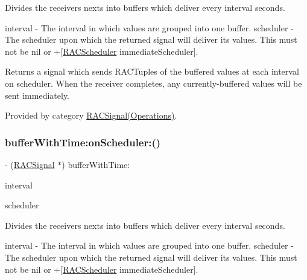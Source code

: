 Divides the receiver\textquotesingle{}s {\ttfamily next}s into buffers which deliver every {\ttfamily interval} seconds.

interval -\/ The interval in which values are grouped into one buffer. scheduler -\/ The scheduler upon which the returned signal will deliver its values. This must not be nil or +\mbox{[}\mbox{\hyperlink{interface_r_a_c_scheduler}{R\+A\+C\+Scheduler}} immediate\+Scheduler\mbox{]}.

Returns a signal which sends R\+A\+C\+Tuples of the buffered values at each interval on {\ttfamily scheduler}. When the receiver completes, any currently-\/buffered values will be sent immediately. 

Provided by category \mbox{\hyperlink{category_r_a_c_signal_07_operations_08_a7f0cb2086a2123f40552d2eab2a9cc54}{R\+A\+C\+Signal(\+Operations)}}.

\mbox{\label{interface_r_a_c_signal_a7f0cb2086a2123f40552d2eab2a9cc54}} 
\subsubsection{\texorpdfstring{buffer\+With\+Time\+:on\+Scheduler\+:()}{bufferWithTime:onScheduler:()}\hspace{0.1cm}{\footnotesize\ttfamily [2/3]}}
{\footnotesize\ttfamily -\/ (\mbox{\hyperlink{interface_r_a_c_signal}{R\+A\+C\+Signal}} $\ast$) buffer\+With\+Time\+: \begin{DoxyParamCaption}\item[{(N\+S\+Time\+Interval)}]{interval }\item[{onScheduler:(\mbox{\hyperlink{interface_r_a_c_scheduler}{R\+A\+C\+Scheduler}} $\ast$)}]{scheduler }\end{DoxyParamCaption}}

Divides the receiver\textquotesingle{}s {\ttfamily next}s into buffers which deliver every {\ttfamily interval} seconds.

interval -\/ The interval in which values are grouped into one buffer. scheduler -\/ The scheduler upon which the returned signal will deliver its values. This must not be nil or +\mbox{[}\mbox{\hyperlink{interface_r_a_c_scheduler}{R\+A\+C\+Scheduler}} immediate\+Scheduler\mbox{]}.

